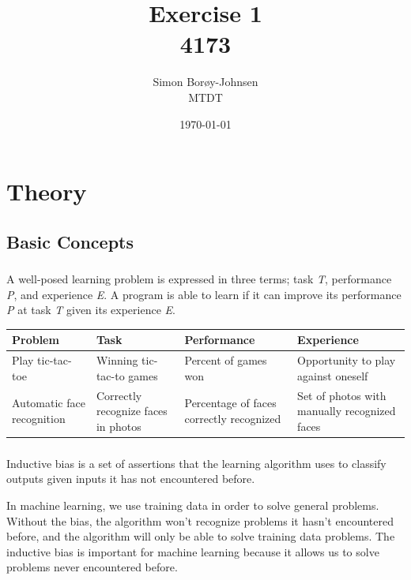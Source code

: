 \documentclass{article}
\begin{document}
\title{\textbf{Exercise 1} \\ 4173}
\author{Simon Borøy-Johnsen \\ MTDT}
\date{\today}
\maketitle



\section{Theory}

\subsection{Basic Concepts}

\subsubsection{}
A well-posed learning problem is expressed in three terms; task \textit{T}, performance \textit{P}, and experience \textit{E}. A program is able to learn if it can improve its performance \textit{P} at task \textit{T} given its experience \textit{E}.

\begin{tabulary}{\textwidth}{|L|L|L|L|}
    \hline
    \textbf{Problem} & \textbf{Task} & \textbf{Performance} & \textbf{Experience} \\\hline
    Play tic-tac-toe & Winning tic-tac-to games & Percent of games won & Opportunity to play against oneself \\\hline
    Automatic face recognition & Correctly recognize faces in photos & Percentage of faces correctly recognized & Set of photos with manually recognized faces \\\hline
\end{tabulary}

\subsubsection{}
Inductive bias is a set of assertions that the learning algorithm uses to classify outputs given inputs it has not encountered before.

In machine learning, we use training data in order to solve general problems. Without the bias, the algorithm won't recognize problems it hasn't encountered before, and the algorithm will only be able to solve training data problems. The inductive bias is important for machine learning because it allows us to solve problems never encountered before.
\end{document}

